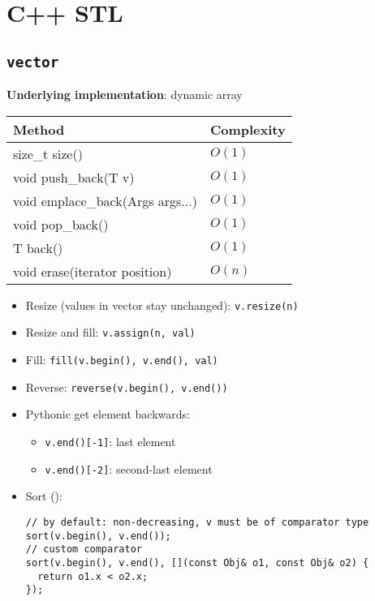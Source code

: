 \section{C++ STL}
  \subsection{\lstinline{vector}}
  \par \textbf{Underlying implementation}: dynamic array
  \begin{table}[H]
    \begin{tabular}{|l|l|}
    \hline
    \textbf{Method}      & \textbf{Complexity}      \\ \hline
    size\_t size()                   & $O(1)$     \\ \hline
    void push\_back(T v)             & $O(1)$     \\ \hline
    void emplace\_back(Args args...) & $O(1)$     \\ \hline
    void pop\_back()                 & $O(1)$     \\ \hline
    T back()                         & $O(1)$     \\ \hline
    void erase(iterator position)    & $O(n)$     \\ \hline
    \end{tabular}
  \end{table}
  \begin{itemize}
    \item Resize (values in vector stay unchanged): \lstinline{v.resize(n)}
    \item Resize and fill: \lstinline{v.assign(n, val)}
    \item Fill: \lstinline{fill(v.begin(), v.end(), val)}
    \item Reverse: \lstinline{reverse(v.begin(), v.end())}
    \item Pythonic get element backwards:
      \begin{itemize}
        \item \lstinline{v.end()[-1]}: last element
        \item \lstinline{v.end()[-2]}: second-last element
      \end{itemize}
    \item Sort ():
\begin{verbatim}
// by default: non-decreasing, v must be of comparator type
sort(v.begin(), v.end());
// custom comparator
sort(v.begin(), v.end(), [](const Obj& o1, const Obj& o2) {
  return o1.x < o2.x;
});
\end{verbatim}
  \end{itemize}

